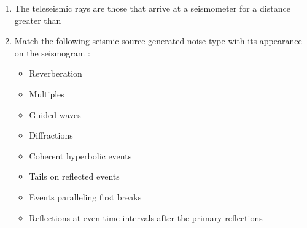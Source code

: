 \documentclass[12pt,fleqn]{article}
\theoremstyle{remark}
\begin{document}
\begin{enumerate}[label=Q.\arabic*.,font=\bfseries, start = 21]
\begin{multicols}{2}
        \end{multicols}
            \begin {enumerate}
            \end{enumerate}
    \item The teleseismic rays are those that arrive at a seismometer for a distance greater than \hfill{} 
            \begin {enumerate}
            \end{enumerate}
    \item Match the following seismic source generated noise type with its appearance on the seismogram : \hfill{} 
                    
            \begin{multicols}{2}
            \begin{itemize}
                \item [P.] Reverberation
                \item [Q.] Multiples
                \item [R.] Guided waves
                \item [S.] Diffractions
            \end{itemize}

            \columnbreak
            
            \begin{itemize}
                \item [1.] Coherent hyperbolic events
                \item [2.] Tails on reflected events
                \item [3.] Events paralleling first breaks
                \item [4.] Reflections at even time intervals after the primary reflections
            \end{itemize}           


\end{multicols}
\end{enumerate}
\end{document}
